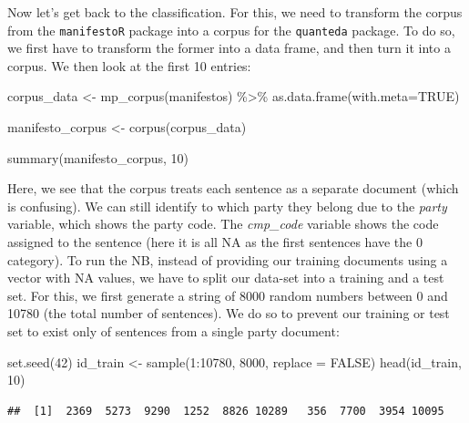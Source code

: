 \documentclass[
]{book}
\newenvironment{Shaded}{\begin{snugshade}}{\end{snugshade}}
\newcommand{\AttributeTok}[1]{\textcolor[rgb]{0.77,0.63,0.00}{#1}}
\newcommand{\ConstantTok}[1]{\textcolor[rgb]{0.00,0.00,0.00}{#1}}
\newcommand{\DecValTok}[1]{\textcolor[rgb]{0.00,0.00,0.81}{#1}}
\newcommand{\FunctionTok}[1]{\textcolor[rgb]{0.00,0.00,0.00}{#1}}
\newcommand{\NormalTok}[1]{#1}
\newcommand{\OtherTok}[1]{\textcolor[rgb]{0.56,0.35,0.01}{#1}}
\newcommand{\SpecialCharTok}[1]{\textcolor[rgb]{0.00,0.00,0.00}{#1}}
\begin{document}
Now let's get back to the classification. For this, we need to transform the corpus from the \texttt{manifestoR} package into a corpus for the \texttt{quanteda} package. To do so, we first have to transform the former into a data frame, and then turn it into a corpus. We then look at the first 10 entries:

\begin{Shaded}
\begin{Highlighting}[]
\NormalTok{corpus\_data }\OtherTok{\textless{}{-}} \FunctionTok{mp\_corpus}\NormalTok{(manifestos) }\SpecialCharTok{\%\textgreater{}\%} 
  \FunctionTok{as.data.frame}\NormalTok{(}\AttributeTok{with.meta=}\ConstantTok{TRUE}\NormalTok{)}

\NormalTok{manifesto\_corpus }\OtherTok{\textless{}{-}} \FunctionTok{corpus}\NormalTok{(corpus\_data)}

\FunctionTok{summary}\NormalTok{(manifesto\_corpus, }\DecValTok{10}\NormalTok{)}
\end{Highlighting}
\end{Shaded}

Here, we see that the corpus treats each sentence as a separate document (which is confusing). We can still identify to which party they belong due to the \emph{party} variable, which shows the party code. The \emph{cmp\_code} variable shows the code assigned to the sentence (here it is all NA as the first sentences have the 0 category). To run the NB, instead of providing our training documents using a vector with NA values, we have to split our data-set into a training and a test set. For this, we first generate a string of 8000 random numbers between 0 and 10780 (the total number of sentences). We do so to prevent our training or test set to exist only of sentences from a single party document:

\begin{Shaded}
\begin{Highlighting}[]
\FunctionTok{set.seed}\NormalTok{(}\DecValTok{42}\NormalTok{)}
\NormalTok{id\_train }\OtherTok{\textless{}{-}} \FunctionTok{sample}\NormalTok{(}\DecValTok{1}\SpecialCharTok{:}\DecValTok{10780}\NormalTok{, }\DecValTok{8000}\NormalTok{, }\AttributeTok{replace =} \ConstantTok{FALSE}\NormalTok{)}
\FunctionTok{head}\NormalTok{(id\_train, }\DecValTok{10}\NormalTok{)}
\end{Highlighting}
\end{Shaded}

\begin{verbatim}
##  [1]  2369  5273  9290  1252  8826 10289   356  7700  3954 10095
\end{verbatim}
\end{document}
